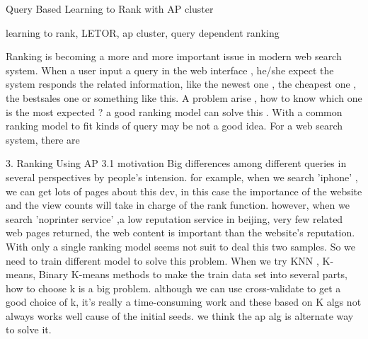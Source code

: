 \documentclass{article}
\begin{document}

Query Based Learning to Rank with AP cluster

learning to rank, LETOR, ap cluster, query dependent ranking



Ranking is becoming  a more and more important issue in modern web search system.
When a user input a query in the web interface , he/she expect the system responds the related information, like the newest one , the cheapest one , the bestsales one or something like this. A problem arise , how to know which one is the most  expected ? a good ranking model can solve this .
With a common ranking model to fit kinds of query may be not a good idea. For a web search system, there are 


3. Ranking Using AP
3.1 motivation
Big differences among  different queries in several perspectives by people's intension. for example, when we search 'iphone' , we can get lots of pages about this dev, in this case the importance of the website and the view counts will take in charge of the rank function. however, when we search 'noprinter service' ,a low reputation service in beijing, very few related web pages returned, the web content is important than the website's reputation. With only a single ranking model seems not suit to deal this two samples. So we need to train different model to solve this problem.
When we try KNN , K-means, Binary K-means methods to make the train data set into several parts, how to choose k is a big problem. although we can use cross-validate to get a good choice of k, it's really a time-consuming work and these based on K algs not always works well cause of the initial seeds. we think the ap alg is alternate way to solve it. 
\end{document}

